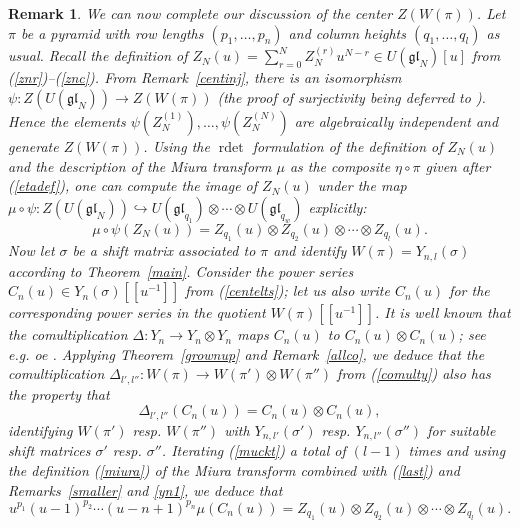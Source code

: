 \documentclass[twoside,12pt,reqno]{amsart}
\makeatletter
\newif\ifcenters@
\newtheorem{Remark}[Proposition]{Remark}
\def\rdet{\operatorname{rdet}}
\makeatother
\begin{document}
\ifcenters@
\begin{Remark}\rm\label{missing}
We can now complete our discussion of the center $Z(W(\pi))$.
Let $\pi$ be a pyramid with row lengths $(p_1,\dots,p_n)$
and column heights $(q_1,\dots,q_l)$ as usual.
Recall the definition of 
$Z_N(u)  = \sum_{r=0}^N Z_N^{(r)} u^{N-r}
\in U(\mathfrak{gl}_N)[u]$ 
from (\ref{znr})--(\ref{znc}). 
From Remark~\ref{centinj},
there is 
an isomorphism $\psi:Z(U(\mathfrak{gl}_N)) \rightarrow Z(W(\pi))$
(the proof of surjectivity being deferred to \cite{BK2}).
Hence the elements
$\psi(Z_N^{(1)}), \dots, \psi(Z_N^{(N)})$ are algebraically independent
and generate $Z(W(\pi))$.
Using the $\rdet$ formulation of the definition of
$Z_N(u)$ and the description of the Miura transform $\mu$ as the composite
$\eta\circ\pi$ given after (\ref{etadef}), one can compute
the image of $Z_N(u)$ under the 
map $\mu \circ \psi:Z(U(\mathfrak{gl}_N))
\hookrightarrow U
(\mathfrak{gl}_{q_1}) \otimes\cdots\otimes
U(\mathfrak{gl}_{q_w})$ explicitly:
\begin{equation}
\label{sofarz}
\mu\circ\psi(Z_N(u)) =
Z_{q_1}(u) \otimes Z_{q_2}(u) \otimes \cdots\otimes Z_{q_l}(u).
\end{equation}
Now let $\sigma$ be a shift matrix associated
to $\pi$ and identify $W(\pi) = Y_{n,l}(\sigma)$
according to 
Theorem~\ref{main}. Consider the 
power series $C_n(u) \in Y_n(\sigma)[[u^{-1}]]$
from (\ref{centelts});
let us also write $C_n(u)$ for the corresponding power series
in the quotient $W(\pi)[[u^{-1}]]$.
It is well known that the comultiplication
$\Delta:Y_n \rightarrow Y_n \otimes Y_n$ maps 
$C_n(u)$ to $C_n(u) \otimes C_n(u)$; see e.g. 
\cite[Proposition 1.11]{NT} oe \cite[Lemma 8.1]{BK}.
Applying Theorem~\ref{grownup} and Remark~\ref{allco}, we deduce that
the comultiplication $\Delta_{l',l''}:W(\pi)\rightarrow W(\pi')
\otimes W(\pi'')$ from (\ref{comulty}) also has the property that
\begin{equation}\label{muckt}
\Delta_{l',l''}(C_n(u)) = C_{n}(u) \otimes C_{n}(u),
\end{equation}
identifying $W(\pi')$ resp. $W(\pi'')$ with
$Y_{n,l'}(\sigma')$ resp. $Y_{n,l''}(\sigma'')$ for suitable
shift matrices $\sigma'$ resp. $\sigma''$.
Iterating (\ref{muckt}) a total of $(l-1)$ times and using the definition
(\ref{miura}) of the Miura transform combined with (\ref{last})
and Remarks~\ref{smaller} and \ref{yn1}, 
we deduce that
\begin{equation}
u^{p_1} (u-1)^{p_2} \cdots (u-n+1)^{p_n}\mu(C_n(u)) = 
Z_{q_1}(u)\otimes Z_{q_2}(u)\otimes \cdots \otimes Z_{q_l}(u).

\end{equation}
\end{Remark}
\end{document}
